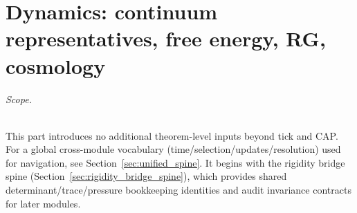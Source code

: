 \part{Dynamics: continuum representatives, free energy, RG, cosmology}

\paragraph{Scope.}
\AuditTag This part introduces no additional theorem-level inputs beyond tick and CAP.
\AuditTag For a global cross-module vocabulary (time/selection/updates/resolution) used for navigation, see Section~\ref{sec:unified_spine}.
It begins with the rigidity bridge spine (Section~\ref{sec:rigidity_bridge_spine}), which provides shared determinant/trace/pressure bookkeeping identities and audit invariance contracts for later modules.













